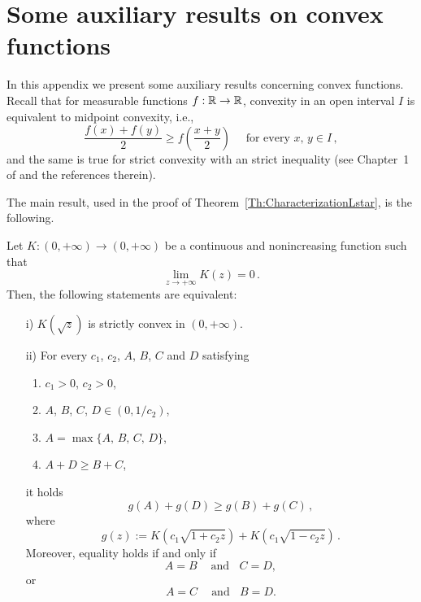 \section{Some auxiliary results on convex functions}
\label{Sec:AuxiliaryResults}

In this appendix we present some auxiliary results concerning convex functions. Recall that for measurable functions $f:\mathbb{R}\to \mathbb{R}$, convexity in an open interval $I$ is equivalent to midpoint convexity, i.e.,
$$
\dfrac{f(x) + f(y)}{2} \geq f \left( \dfrac{x+y}{2}\right) \quad \textrm{ for every } x,\, y \in I\,,
$$
and the same is true for strict convexity with an strict inequality
(see Chapter~1 of \cite{Niculescu} and the references therein).


The main result, used in the proof of Theorem~\ref{Th:CharacterizationLstar}, is the following.

\begin{proposition}
	\label{Prop:EquivalenceK(sqrt)Convex<->Inequality}
	Let $K:(0, +\infty) \to (0,+\infty)$ be a continuous and nonincreasing function such that
	$$
	\lim_{z\to +\infty} K(z) = 0\,.
	$$
	Then, the following statements are equivalent:
	\begin{enumerate}
		\item[i)] $K(\sqrt{z})$ is strictly convex in $(0, +\infty)$.
		\item[ii)] For every $c_1$, $c_2$, $A$, $B$, $C$ and $D$ satisfying
		\begin{enumerate}
			\item $c_1 > 0$, $c_2>0$,
			\item $A$, $B$, $C$, $D \in (0, 1/c_2)$,
			\item $A = \max\{A,\, B,\, C,\, D\}$,
			\item $A + D \geq B + C$,
		\end{enumerate}
		it holds
		$$
		g(A) + g(D) \geq g(B) + g(C)\,,
		$$
		where
		$$
		g(z) := K(c_1 \sqrt{1 + c_2z}) + K(c_1 \sqrt{1 - c_2z})\,.
		$$
		Moreover, equality holds if and only if
		$$ A = B \ \ \ \ \textrm{ and} \ \ \ \ C=D, $$
		or
		$$ A = C \ \ \ \ \textrm{ and} \ \ \ \ B=D. $$
	\end{enumerate}
\end{proposition}



